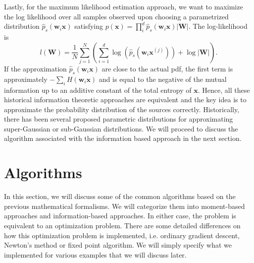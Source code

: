 \documentclass[aps,prl,preprint,superscriptaddress]{revtex4-2}
\begin{document}
Lastly, for the maximum likelihood estimation approach, we want to maximize the log likelihood over all samples observed upon choosing a parametrized distribution $\hat{p}_{s}(\mathbf{w}_{i}\mathbf{x})$ satisfying $p(\mathbf{x}) = \prod_{i}^{d}\hat{p}_{s}(\mathbf{w}_{i}\mathbf{x})|\mathbf{W}|$. The log-likelihood is 
\begin{equation}
l(\mathbf{W}) = \frac{1}{N}\sum_{j=1}^{N}(\sum_{i=1}^{d}\log(\hat{p}_{s}(\mathbf{w}_{i}\mathbf{x}^{(j)}))+\log|\mathbf{W}|).
\end{equation}   
If the approximation $\hat{p}_{s}(\mathbf{w}_{i}\mathbf{x})$ are close to the actual pdf, the first term is approximately $-\sum_{i}H(\mathbf{w}_{i}\mathbf{x})$ and is equal to the negative of the mutual information up to an additive constant of the total entropy of $\mathbf{x}$. Hence, all these historical information theoretic approaches are equivalent and the key idea is to approximate the probability distribution of the sources correctly. Historically, there has been several proposed parametric distributions for approximating super-Gaussian or sub-Gaussian distributions. We will proceed to discuss the algorithm associated with the information based approach in the next section. 

\section{Algorithms}
In this section, we will discuss some of the common algorithms based on the previous mathematical formalisms. We will categorize them into moment-based approaches and information-based approaches. In either case, the problem is equivalent to an optimization problem. There are some detailed differences on how this optimization problem is implemented, i.e. ordinary gradient descent, Newton's method or fixed point algorithm. We will simply specify what we implemented for various examples that we will discuss later. 
\end{document}
